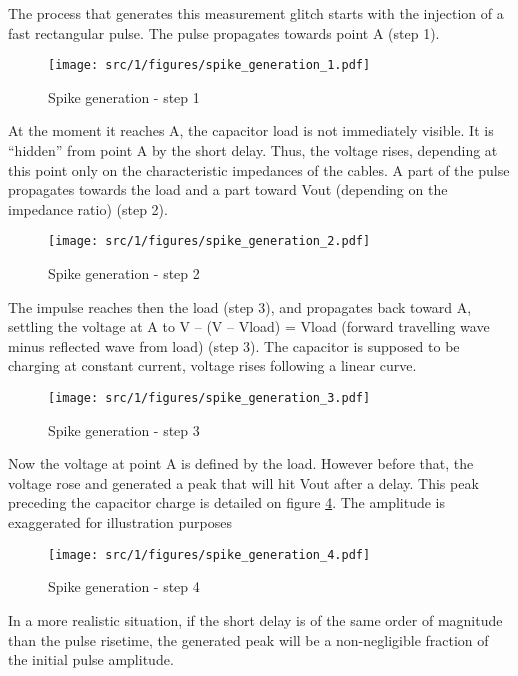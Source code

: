 The process that generates this measurement glitch starts with the injection of a fast rectangular pulse.
The pulse propagates towards point A (step 1).

\begin{figure}[!h]
  \centering
  \texttt{[image: src/1/figures/spike\_generation\_1.pdf]}
  \caption{Spike generation - step 1}
  \label{fig:spike-step-1}
\end{figure}

At the moment it reaches A, the capacitor load is not immediately visible.
It is “hidden” from point A by the short delay.
Thus, the voltage rises, depending at this point only on the characteristic impedances of the cables.
A part of the pulse propagates towards the load and a part toward Vout (depending on the impedance ratio) (step 2).

\begin{figure}[!h]
  \centering
  \texttt{[image: src/1/figures/spike\_generation\_2.pdf]}
  \caption{Spike generation - step 2}
  \label{fig:spike-step-2}
\end{figure}

The impulse reaches then the load (step 3), and propagates back toward A, settling the voltage at A to
V – (V – Vload) = Vload (forward travelling wave minus reflected wave from load) (step 3).
The capacitor is supposed to be charging at constant current, voltage rises following a linear curve.

\begin{figure}[!h]
  \centering
  \texttt{[image: src/1/figures/spike\_generation\_3.pdf]}
  \caption{Spike generation - step 3}
  \label{fig:spike-step-3}
\end{figure}

Now the voltage at point A is defined by the load.
However before that, the voltage rose and generated a peak that will hit Vout after a delay.
This peak preceding the capacitor charge is detailed on figure \ref{fig:spike-step-4}.
The amplitude is exaggerated for illustration purposes

\begin{figure}[!h]
  \centering
  \texttt{[image: src/1/figures/spike\_generation\_4.pdf]}
  \caption{Spike generation - step 4}
  \label{fig:spike-step-4}
\end{figure}

In a more realistic situation, if the short delay is of the same order of magnitude than the pulse risetime, the generated peak will be a non-negligible fraction of the initial pulse amplitude.

